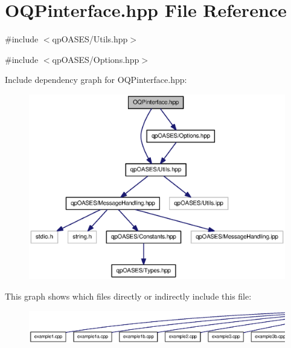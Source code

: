 \section{OQPinterface.hpp File Reference}
\label{OQPinterface_8hpp}
{\ttfamily \#include $<$qpOASES/Utils.hpp$>$}\par
{\ttfamily \#include $<$qpOASES/Options.hpp$>$}\par
Include dependency graph for OQPinterface.hpp:
\nopagebreak
\begin{figure}[H]
\begin{center}
\leavevmode
\includegraphics[width=400pt]{OQPinterface_8hpp__incl}
\end{center}
\end{figure}
This graph shows which files directly or indirectly include this file:
\nopagebreak
\begin{figure}[H]
\begin{center}
\leavevmode
\includegraphics[width=400pt]{OQPinterface_8hpp__dep__incl}
\end{center}
\end{figure}
